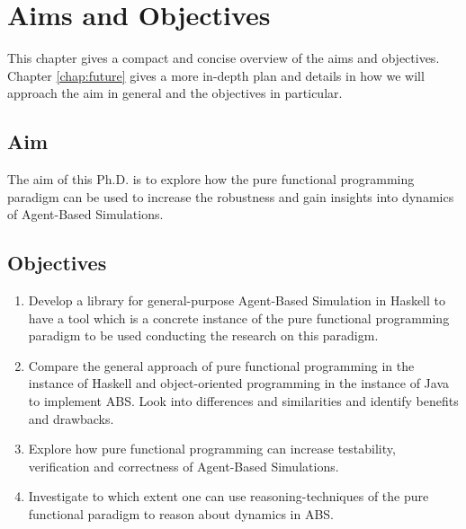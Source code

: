 \chapter{Aims and Objectives}
\label{chap:aimsObj}

This chapter gives a compact and concise overview of the aims and objectives. Chapter \ref{chap:future} gives a more in-depth plan and details in how we will approach the aim in general and the objectives in particular.

\section{Aim}
The aim of this Ph.D. is to explore how the pure functional programming paradigm can be used to increase the robustness and gain insights into dynamics of Agent-Based Simulations.

\section{Objectives}
\begin{enumerate}
	\item Develop a library for general-purpose Agent-Based Simulation in Haskell to have a tool which is a concrete instance of the pure functional programming paradigm to be used conducting the research on this paradigm.

	\item Compare the general approach of pure functional programming in the instance of Haskell and object-oriented programming in the instance of Java to implement ABS. Look into differences and similarities and identify benefits and drawbacks.

	\item Explore how pure functional programming can increase testability, verification and correctness of Agent-Based Simulations.

	\item Investigate to which extent one can use reasoning-techniques of the pure functional paradigm to reason about dynamics in ABS.
\end{enumerate}